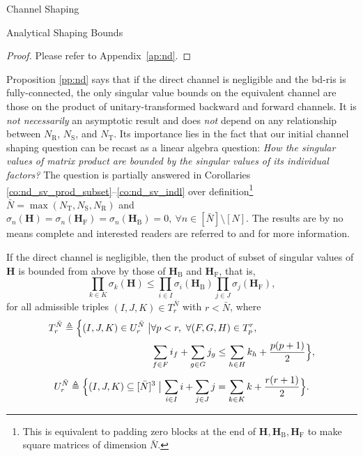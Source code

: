 \documentclass[journal]{IEEEtran}
\begin{document}
\begin{section}{Channel Shaping}
\begin{subsection}{Analytical Shaping Bounds}
		\begin{proof}
			Please refer to Appendix~\ref{ap:nd}.
		\end{proof}

		Proposition \ref{pp:nd} says that if the direct channel is negligible and the \gls{bd}-\gls{ris} is fully-connected, the only singular value bounds on the equivalent channel are those on the product of unitary-transformed backward and forward channels.
		It is \emph{not necessarily} an asymptotic result and does \emph{not} depend on any relationship between $N_\mathrm{R}$, $N_\mathrm{S}$, and $N_\mathrm{T}$.
		Its importance lies in the fact that our initial channel shaping question can be recast as a linear algebra question: \emph{How the singular values of matrix product are bounded by the singular values of its individual factors?}
		The question is partially answered in Corollaries \ref{co:nd_sv_prod_subset}--\ref{co:nd_sv_indl} over definition\footnote{This is equivalent to padding zero blocks at the end of $\mathbf{H}, \mathbf{H}_\mathrm{B}, \mathbf{H}_\mathrm{F}$ to make square matrices of dimension $\bar{N}$.} $\bar{N} = \max(N_\mathrm{T},N_\mathrm{S},N_\mathrm{R})$ and $\sigma_n(\mathbf{H})=\sigma_n(\mathbf{H}_\mathrm{F})=\sigma_n(\mathbf{H}_\mathrm{B})=0, \ \forall n \in [\bar{N}] \setminus [N]$.
		The results are by no means complete and interested readers are referred to \cite[Chapter 16, 24]{Hogben2013} and \cite[Chapter 3]{Horn1994} for more information.


		\begin{corollary}
			\label{co:nd_sv_prod_subset}
			If the direct channel is negligible,
			then the product of subset of singular values of $\mathbf{H}$ is bounded from above by those of $\mathbf{H}_\mathrm{B}$ and $\mathbf{H}_\mathrm{F}$, that is,
			\begin{equation}
				\label{iq:horn}
				\prod_{k \in {K}} \sigma_k(\mathbf{H}) \le \prod_{i \in {I}} \sigma_i(\mathbf{H}_\mathrm{B}) \prod_{j \in {J}} \sigma_j(\mathbf{H}_\mathrm{F}),
			\end{equation}
			for all admissible triples $(I, J, K) \in T_r^{\bar{N}}$ with $r < \bar{N}$, where
			\begin{equation*}
				\begin{split}
					T_r^{\bar{N}} \triangleq \Bigl\{(I, J, K) \in U_r^{\bar{N}} \bigm\vert & \forall p < r, \ \forall (F, G, H) \in T_p^r,                                              \\
																							& \sum_{f \in F} i_f + \sum_{g \in G} j_g \le \sum_{h \in H} k_h + \frac{p(p+1)}{2} \Bigr\},
				\end{split}
			\end{equation*}
			\begin{equation*}
				U_r^{\bar{N}} \triangleq \Bigl\{(I, J, K) \subseteq [\bar{N}]^3 \bigm\vert \sum_{i \in I} i + \sum_{j \in J} j = \sum_{k \in K} k + \frac{r(r+1)}{2}\Bigr\}.
			\end{equation*}
		\end{corollary}


\end{subsection}
\end{section}
\end{document}
